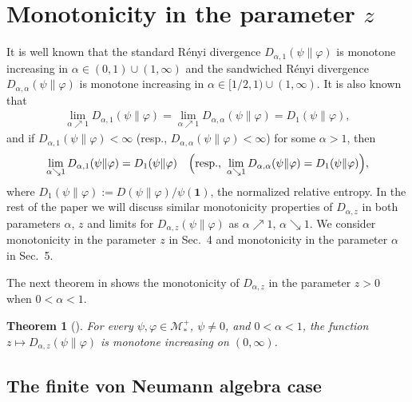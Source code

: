\documentclass[12pt]{article}
\newtheorem{theorem}{Theorem}[section]
\theoremstyle{definition}
\theoremstyle{remark}
\numberwithin{equation}{section}
\def\cM{\mathcal M}
\def\ffi{\varphi}
\def\1{\mathbf{1}}
\begin{document}
\section{Monotonicity in the parameter $z$}

It is well known \cite{berta2018renyi,hiai2018quantum,jencova2018renyi} that the standard R\'enyi divergence
$D_{\alpha,1}(\psi\|\ffi)$ is monotone increasing in $\alpha\in(0,1)\cup(1,\infty)$ and the sandwiched R\'enyi
divergence $D_{\alpha,\alpha}(\psi\|\ffi)$ is monotone increasing in $\alpha\in[1/2,1)\cup(1,\infty)$. It is also
known \cite{berta2018renyi,hiai2018quantum,jencova2018renyi} that
\begin{align}\label{F-6.1}
\lim_{\alpha\nearrow1}D_{\alpha,1}(\psi\|\ffi)=\lim_{\alpha\nearrow1}D_{\alpha,\alpha}(\psi\|\ffi)
=D_1(\psi\|\ffi),
\end{align}
and if $D_{\alpha,1}(\psi\|\ffi)<\infty$ (resp., $D_{\alpha,\alpha}(\psi\|\ffi)<\infty$) for some $\alpha>1$, then
\begin{align}\label{F-6.2}
\lim_{\alpha\searrow1}D_{\alpha,1}(\psi\|\ffi)=D_1(\psi\|\ffi)\quad
\Bigl(\mbox{resp.,}\ \lim_{\alpha\searrow1}D_{\alpha,\alpha}(\psi\|\ffi)=D_1(\psi\|\ffi)\Bigr),
\end{align}
where $D_1(\psi\|\ffi):=D(\psi\|\ffi)/\psi(\1)$, the normalized relative entropy.
In the rest of the paper we will discuss similar monotonicity properties {of $D_{\alpha,z}$ in
both parameters $\alpha$, $z$ and limits for $D_{\alpha,z}(\psi\|\ffi)$ as
$\alpha\nearrow1$, $\alpha\searrow1$.} We consider monotonicity in the parameter $z$ in Sec.~4
and monotonicity in the parameter $\alpha$ in Sec.~5.

The next theorem in \cite{kato2023onrenyi} shows the monotonicity of $D_{\alpha,z}$ in the
parameter $z>0$ when $0<\alpha<1$.

\begin{theorem}[\mbox{\cite[Theorem 1(x)]{kato2023onrenyi}}]\label{T-5.1}
For every $\psi,\ffi\in\cM_*^+$, $\psi\ne0$, and $0<\alpha<1$, the function
$z\mapsto D_{\alpha,z}(\psi\|\ffi)$ is monotone increasing on $(0,\infty)$.
\end{theorem}

\subsection{The finite von Neumann algebra case}
\end{document}
